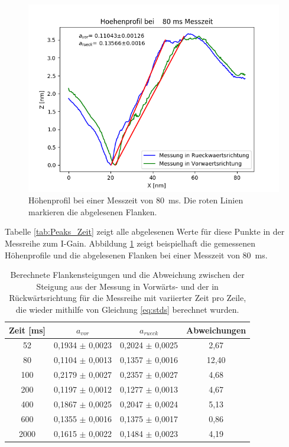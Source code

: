 \documentclass[12pt,a4paper]{article}
\begin{document}
\begin{figure}
\centering
\includegraphics[scale=0.8]{Bilder/Profil_Zeit_80_Peakbestimmung.png}
\caption{Höhenprofil bei einer Messzeit von \SI{80}{ms}. Die roten Linien markieren die abgelesenen Flanken.}
\label{fig:Gold_Zeit_Flankensteigung}
\end{figure}

Tabelle \ref{tab:Peaks_Zeit} zeigt alle abgelesenen Werte für diese Punkte in der Messreihe zum I-Gain. Abbildung \ref{fig:Gold_Zeit_Flankensteigung} zeigt beispielhaft die gemessenen Höhenprofile und die abgelesenen Flanken bei einer Messzeit von \SI{80}{ms}.

\begin{table}
\centering
\begin{tabular}{|c|c|c|c|}
\hline 
Zeit [ms] & $a_{vor}$ & $a_{rueck}$ & Abweichungen \\ 
\hline 
52 & 0,1934 $\pm$ 0,0023 & 0,2024 $\pm$ 0,0025 & 2,67 \\
\hline 
80 & 0,1104 $\pm$ 0,0013 & 0,1357 $\pm$ 0,0016 & 12,40 \\ 
\hline 
100 & 0,2179 $\pm$ 0,0027 & 0,2357 $\pm$ 0,0027 & 4,68 \\
\hline 
200 & 0,1197 $\pm$ 0,0012 & 0,1277 $\pm$ 0,0013 & 4,67 \\
\hline 
400 & 0,1867 $\pm$ 0,0025 & 0,2047 $\pm$ 0,0024 & 5,13 \\
\hline 
600 & 0,1355 $\pm$ 0,0016 & 0,1375 $\pm$ 0,0017 & 0,86 \\
\hline 
2000 & 0,1615 $\pm$ 0,0022 & 0,1484 $\pm$ 0,0023 & 4,19 \\
\hline 
\end{tabular} 
\caption{Berechnete Flankensteigungen und die Abweichung zwischen der Steigung aus der Messung in Vorwärts- und der in Rückwärtsrichtung für die Messreihe mit variierter Zeit pro Zeile, die wieder mithilfe von Gleichung \ref{eq:stds} berechnet wurden.}
\label{tab:Steigungen_Zeit}
\end{table}
\end{document}
